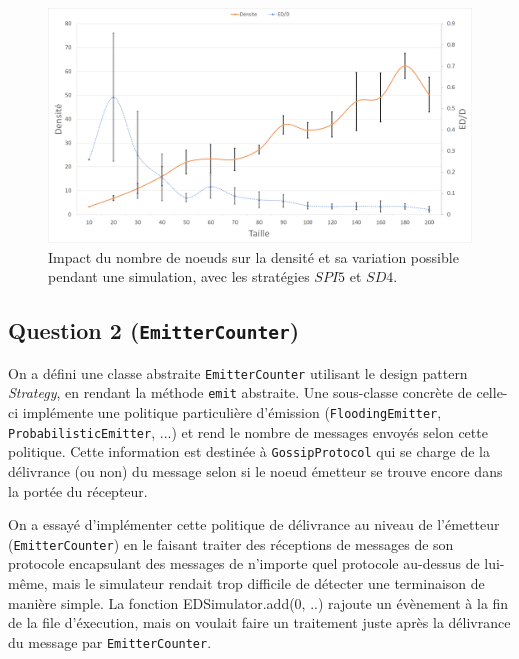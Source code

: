 \documentclass[a4paper]{article}
\begin{document}
\begin{figure}[H]
\begin{minipage}{\textwidth}
  \centering
    \includegraphics[width=\textwidth]{images/ex2.png}
    \caption{Impact du nombre de noeuds sur la densité et sa variation possible
      pendant une simulation, avec les stratégies $SPI5$ et $SD4$.}
\end{minipage}
\end{figure}

\subsection{Question 2 (\texttt{EmitterCounter})}
On a défini une classe abstraite \texttt{EmitterCounter} utilisant le
design pattern \textsl{Strategy}, en rendant la méthode \texttt{emit}
abstraite. Une sous-classe concrète de celle-ci implémente une politique particulière d'émission
(\texttt{FloodingEmitter}, \texttt{ProbabilisticEmitter}, ...) et rend
le nombre de messages envoyés selon cette politique.
Cette information est destinée à \texttt{GossipProtocol} qui se charge
de la délivrance (ou non) du message selon si le noeud émetteur se
trouve encore dans la portée du récepteur.

On a essayé d'implémenter
cette politique de délivrance au niveau de l'émetteur
(\texttt{EmitterCounter}) en le faisant traiter des réceptions de
messages de son protocole encapsulant des messages de n'importe quel
protocole au-dessus de lui-même, mais le simulateur rendait trop difficile de détecter
une terminaison de manière simple. La fonction EDSimulator.add(0, ..)
rajoute un évènement à la fin de la file d'éxecution, mais on voulait
faire un traitement juste après la délivrance du message par \texttt{EmitterCounter}.
\end{document}
